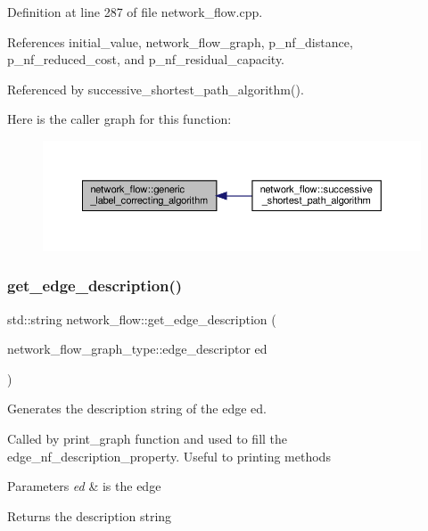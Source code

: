 Definition at line 287 of file network\+\_\+flow.\+cpp.



References initial\+\_\+value, network\+\_\+flow\+\_\+graph, p\+\_\+nf\+\_\+distance, p\+\_\+nf\+\_\+reduced\+\_\+cost, and p\+\_\+nf\+\_\+residual\+\_\+capacity.



Referenced by successive\+\_\+shortest\+\_\+path\+\_\+algorithm().

Here is the caller graph for this function\+:
\nopagebreak
\begin{figure}[H]
\begin{center}
\leavevmode
\includegraphics[width=350pt]{d2/d4f/classnetwork__flow_ae929e866017b89fc52422de8e041d8f4_icgraph}
\end{center}
\end{figure}
\mbox{\label{classnetwork__flow_aa2eff0f34c5f856ec9541fcc967dccce}} 
\subsubsection{\texorpdfstring{get\+\_\+edge\+\_\+description()}{get\_edge\_description()}}
{\footnotesize\ttfamily std\+::string network\+\_\+flow\+::get\+\_\+edge\+\_\+description (\begin{DoxyParamCaption}\item[{network\+\_\+flow\+\_\+graph\+\_\+type\+::edge\+\_\+descriptor}]{ed }\end{DoxyParamCaption})\hspace{0.3cm}{\ttfamily [private]}}



Generates the description string of the edge ed. 

Called by print\+\_\+graph function and used to fill the edge\+\_\+nf\+\_\+description\+\_\+property. Useful to printing methods 
\begin{DoxyParams}{Parameters}
{\em ed} & is the edge \\
\hline
\end{DoxyParams}
\begin{DoxyReturn}{Returns}
the description string 
\end{DoxyReturn}


